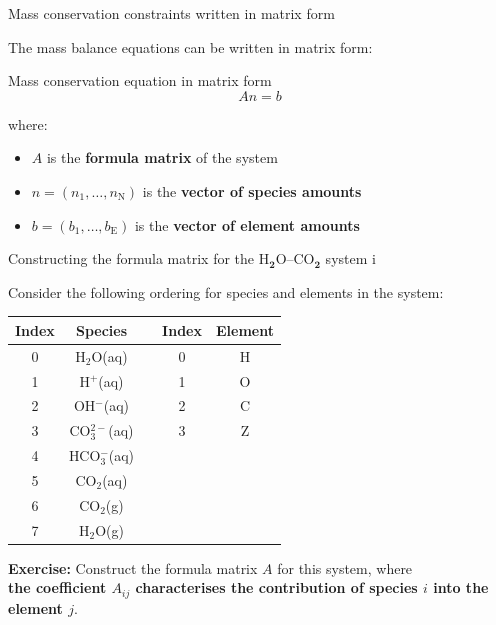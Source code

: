 %
\begin{frame}{Mass conservation constraints written in matrix form}

The mass balance equations can be written in matrix form: \\[10pt]

\begin{cbox}{Mass conservation equation in matrix form}{\Large{}
\[
An=b
\]
}\end{cbox}where:
\begin{itemize}
\item $A$ is the \textbf{formula matrix} of the system
\item $n=(n_{1},\ldots,n_{\text{N}})$ is the \textbf{vector of species
amounts}
\item $b=(b_{1},\ldots,b_{\text{E}})$ is the \textbf{vector of element
amounts}
\end{itemize}
\end{frame}
%
%
\begin{frame}[<+->]{Constructing the formula matrix for the H$_{\boldsymbol{2}}$O–CO$_{\boldsymbol{2}}$ system\; i}

Consider the following ordering for species and elements in the system:
\begin{center}
\begin{tabular*}{1\textwidth}{@{\extracolsep{\fill}}ccccc}
\toprule 
\textbf{Index} & \textbf{Species} &  & \textbf{Index} & \textbf{Element}\tabularnewline
\midrule
0 & H$_{2}$O(aq) &  & 0 & H\tabularnewline
1 & H$^{+}$(aq) &  & 1 & O\tabularnewline
2 & OH$^{-}$(aq) &  & 2 & C\tabularnewline
3 & CO$_{3}^{2-}$(aq) &  & 3 & Z\tabularnewline
4 & HCO$_{3}^{-}$(aq) &  &  & \tabularnewline
5 & CO$_{2}$(aq) &  &  & \tabularnewline
6 & CO$_{2}$(g) &  &  & \tabularnewline
7 & H$_{2}$O(g) &  &  & \tabularnewline
\bottomrule
\end{tabular*}
\par\end{center}

\alert{\textbf{Exercise:}} Construct the formula matrix $A$ for this system, where \\
\alert{\textbf{the coefficient $A_{ij}$ characterises the contribution of species 
$i$ into the element $j$}}. 
\end{frame}
